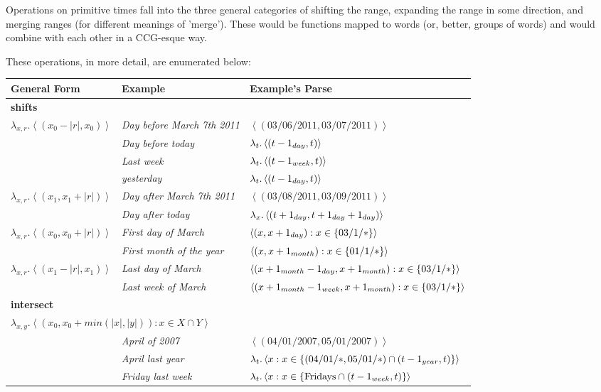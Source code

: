 \documentclass{article}
\begin{document}
Operations on primitive times fall into the three general categories
	of shifting the range, expanding the range in some direction,
	and merging ranges (for different meanings of 'merge').
These would be functions mapped to words (or, better, groups of words)
	and would combine with each other in a CCG-esque way.

These operations, in more detail, are enumerated below:

\begin{center}
\begin{tabular}{l l l}
	{\bf General Form} & {\bf Example} & {\bf Example's Parse} \\
	\hline

	\multicolumn{3}{l}{{\bf shifts}} \\
	$\lambda_{x,r}.\left< (x_0-|r|, x_0) \right>$
		& {\em Day before March 7th 2011} 
			& $\left< (03/06/2011,03/07/2011) \right>$\\
		& {\em Day before today} 
			& $\lambda_{t}.\left< (t-1_{day},t) \right>$\\
		& {\em Last week} 
			& $\lambda_t.\left< (t-1_{week},t) \right>$ \\
		& {\em yesterday} 
			& $\lambda_t.\left< (t-1_{day},t) \right>$ \\
	$\lambda_{x,r}.\left< (x_1, x_1+|r|) \right>$
		& {\em Day after March 7th 2011} 
			& $\left< (03/08/2011,03/09/2011) \right>$\\
		& {\em Day after today} 
			& $\lambda_{x}.\left< (t+1_{day},t+1_{day}+1_{day}) \right>$\\
	
	$\lambda_{x,r}.\left< (x_0, x_0+|r|) \right>$
		& {\em First day of March} 
			& $\left< (x,x+1_{day}) : x \in \{ 03/1/* \} \right>$ \\
		& {\em First month of the year} 
			& $\left< (x,x+1_{month}) : x \in \{ 01/1/* \} \right>$ \\
	$\lambda_{x,r}.\left< (x_1-|r|, x_1) \right>$
		& {\em Last day of March} 
			& $\left< (x+1_{month}-1_{day},x+1_{month}) 
				: x \in \{ 03/1/* \} \right>$ \\
		& {\em Last week of March} 
			& $\left< (x+1_{month}-1_{week},x+1_{month}) 
				: x \in \{ 03/1/* \} \right>$ \\
	
	\multicolumn{3}{l}{{\bf intersect}} \\
	\multicolumn{3}{l}{
			$\lambda_{x,y}.\left< (x_0, x_0+min(|x|,|y|)) : x \in X \cap Y \right>$}\\
		& {\em April of 2007} 
			& $\left< (04/01/2007,05/01/2007) \right>$ \\
		& {\em April last year} 
			& $\lambda_t.\left< x 
			  : x \in \{ (04/01/*,05/01/*) \cap (t-1_{year},t) \} \right>$ \\
		& {\em Friday last week} 
			& $\lambda_t.\left< x 
			  : x \in \{ \text{Fridays} \cap (t-1_{week},t) \} \right>$ \\
	

\end{tabular}
\end{center}
\end{document}
